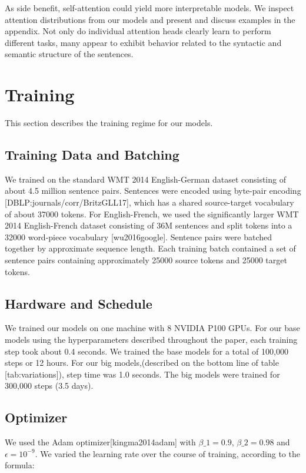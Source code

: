 \documentclass[11pt,a4paper]{article}
\begin{document}
As side benefit, self-attention could yield more interpretable models. We inspect attention distributions from our models and present and discuss examples in the appendix. Not only do individual attention heads clearly learn to perform different tasks, many appear to exhibit behavior related to the syntactic and semantic structure of the sentences.

\section{Training}

This section describes the training regime for our models.

\subsection{Training Data and Batching}

We trained on the standard WMT 2014 English-German dataset consisting of about 4.5 million sentence pairs.  Sentences were encoded using byte-pair encoding [DBLP:journals/corr/BritzGLL17], which has a shared source-target vocabulary of about 37000 tokens. For English-French, we used the significantly larger WMT 2014 English-French dataset consisting of 36M sentences and split tokens into a 32000 word-piece vocabulary [wu2016google].  Sentence pairs were batched together by approximate sequence length.  Each training batch contained a set of sentence pairs containing approximately 25000 source tokens and 25000 target tokens.

\subsection{Hardware and Schedule}

We trained our models on one machine with 8 NVIDIA P100 GPUs.  For our base models using the hyperparameters described throughout the paper, each training step took about 0.4 seconds.  We trained the base models for a total of 100,000 steps or 12 hours.  For our big models,(described on the bottom line of table [tab:variations]), step time was 1.0 seconds.  The big models were trained for 300,000 steps (3.5 days).

\subsection{Optimizer}

We used the Adam optimizer[kingma2014adam] with $\beta\_1=0.9$, $\beta\_2=0.98$ and $\epsilon=10^{-9}$.  We varied the learning rate over the course of training, according to the formula:
\end{document}
